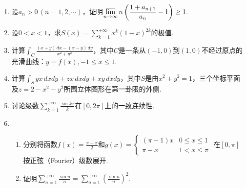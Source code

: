 \documentclass{article}
\begin{document}
\begin{enumerate}
\item
设$a_n>0\,(n=1,2,\cdots)$，证明$\displaystyle \varlimsup_{n\to\infty}n\left(\frac{1+a_{n+1}}{a_n}-1\right)\ge 1$.
\item
设$0<x<1$，求$\displaystyle S(x)=\sum_{k=1}^{+\infty}x^k(1-x)^{2k}$的极值.
\item
计算$\displaystyle \int_C \frac{(x+y)\,dx-(x-y)\,dy}{x^2+y^2}$，其中$C$是一条从$(-1,0)$到$(1,0)$不经过原点的光滑曲线：$y=f(x),-1\le x\le 1$.
\item
计算$\displaystyle \int_S yx\,dxdy+zx\,dxdy+xy\,dxdy$，其中$S$是由$x^2+y^2=1$，三个坐标平面及$z=2-x^2-y^2$所围立体图形在第一卦限的外侧.
\item
讨论级数$\displaystyle \sum_{k=1}^{+\infty}\frac{\sin kx}{k}$在$[0,2\pi]$上的一致连续性.
\item
\begin{enumerate}
\item
分别将函数$\displaystyle f(x)=\frac{\pi - x}{2}$和$\displaystyle g(x)=
\begin{cases}
(\pi-1)x & 0\le x\le 1\\
\pi-x & 1 < x \le \pi
\end{cases}$
在$[0,\pi]$按正弦（Fourier）级数展开.
\item
证明$\displaystyle \sum_{n=1}^{+\infty}\frac{\sin n}{n}=\sum_{n=1}^{+\infty}\left(\frac{\sin n}{n}\right)^2$.
\end{enumerate}
\end{enumerate}
\end{document}
